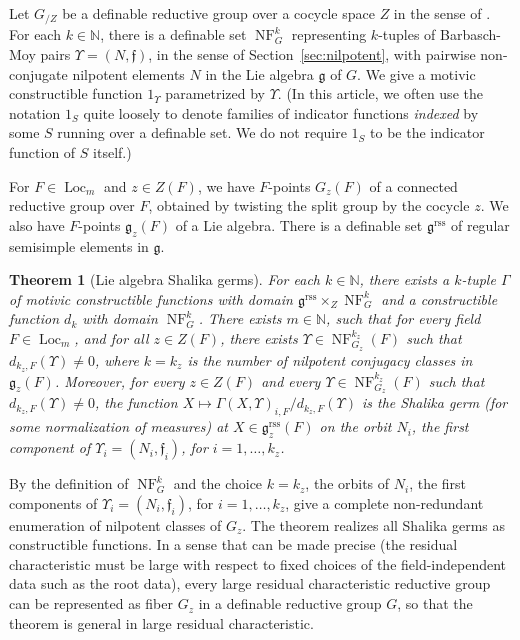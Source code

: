\documentclass[12pt]{amsart}
\newcommand{\op}[1]{\operatorname{#1}}
\newcommand{\ring}[1]{{\mathbb #1}}
\def\NF{\op{NF}}
\def\Y{\Upsilon}
\def\s{{\mathfrak{f}}}
\newcommand{\fg}{\mathfrak{g}}
\newcommand{\reg}{\mathrm{rss}}
\theoremstyle{plain}
\newtheorem{theorem}[thm]{Theorem}
\theoremstyle{definition}
\begin{document}
Let $G_{/Z}$ be a definable reductive group over a cocycle space $Z$
in the sense of \cite{CGH}.  For each $k\in\ring{N}$, there is a
definable set $\NF^k_G$ representing $k$-tuples of Barbasch-Moy pairs
$\Y=(N,\s)$, in the sense of Section~\ref{sec:nilpotent}, with
pairwise non-conjugate nilpotent elements $N$ in the Lie algebra $\fg$
of $G$.  We give a motivic constructible function $1_\Y$ parametrized
by $\Y$.  (In this article, we often use the notation $1_S$ quite
loosely to denote families of indicator functions {\it indexed} by
some $S$ running over a definable set. We do not require $1_S$ to be
the indicator function of $S$ itself.)

For $F\in \op{Loc}_m$ and $z\in Z(F)$, we have $F$-points $G_z(F)$ of
a connected reductive group over $F$, obtained by twisting the split
group by the cocycle $z$. We also have $F$-points $\fg_z(F)$ of a Lie
algebra. There is a definable set $\fg^\reg$ of regular semisimple
elements in $\fg$.




\begin{theorem} [Lie algebra Shalika germs]\label{thm:lie-shalika} 
  For each $k\in \ring{N}$, there exists a $k$-tuple $\Gamma$ of
  motivic constructible functions with domain $\fg^\reg\times_Z
  \NF^k_G$ and a constructible function $d_k$ with domain $\NF^k_G$.
  There exists $m\in \ring{N}$, such that for every field $F\in
  \op{Loc}_{m}$, and for all $z\in Z(F)$, there exists $\Y\in
  \NF^{k_z}_{G_z}(F)$ such that $d_{k_z,F}(\Y)\ne 0$, where $k = k_z$
  is the number of nilpotent conjugacy classes in $\fg_z(F)$.
  Moreover, for every $z\in Z(F)$ and every $\Y\in \NF^{k_z}_{G_z}(F)$
  such that $d_{k_z,F}(\Y)\ne 0$, the function $X\mapsto
  \Gamma(X,\Y)_{i,F}/d_{k_z,F}(\Y)$ is the Shalika germ (for some
  normalization of measures) at $X\in \fg^\reg_z(F)$ on the orbit
  $N_i$, the first component of $\Y_i=(N_i,\s_i)$, for $i=1,\ldots,k_z$.
\end{theorem}

By the definition of $\NF^k_{G}$ and the choice $k=k_z$, the orbits of
$N_i$, the first components of
$\Y_i=(N_i,\s_i)$, for $i=1,\ldots,k_z$, give a complete non-redundant
enumeration of nilpotent classes of $G_z$.  The theorem realizes all
Shalika germs as constructible functions.  In a sense that can be made
precise (the residual characteristic must be large with respect to
fixed choices of the field-independent data such as the root data),
every large residual characteristic reductive group can be represented
as fiber $G_z$ in a definable reductive group $G$, so that the
theorem is general in large residual characteristic.
\end{document}
